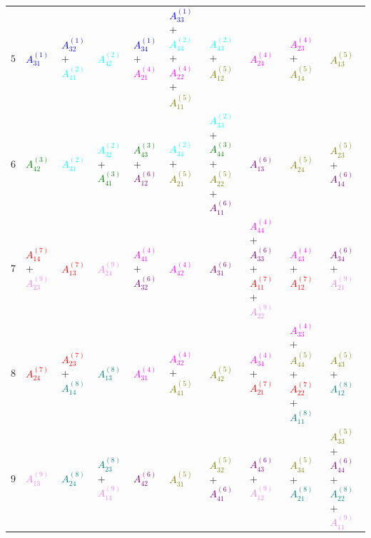 \documentclass[times,namecite]{goose-article}
\begin{document}
\begin{landscape}
{\begin{tabular}{|c|C{31mm}C{31mm}C{31mm}C{31mm}C{31mm}C{31mm}C{31mm}C{31mm}C{31mm}|}
$5 $& \textcolor{blue}{$A_{31}^{(1)}$} & \textcolor{blue}{$A_{32}^{(1)}$}+\textcolor{cyan}{$A_{41}^{(2)}$} & \textcolor{cyan}{$A_{42}^{(2)}$} & \textcolor{blue}{$A_{34}^{(1)}$}+\textcolor{magenta}{$A_{21}^{(4)}$} & \textcolor{blue}{$A_{33}^{(1)}$}+\textcolor{cyan}{$A_{44}^{(2)}$}+\textcolor{magenta}{$A_{22}^{(4)}$}+\textcolor{olive}{$A_{11}^{(5)}$} & \textcolor{cyan}{$A_{43}^{(2)}$}+\textcolor{olive}{$A_{12}^{(5)}$} & \textcolor{magenta}{$A_{24}^{(4)}$} & \textcolor{magenta}{$A_{23}^{(4)}$}+\textcolor{olive}{$A_{14}^{(5)}$} & \textcolor{olive}{$A_{13}^{(5)}$} \\
$6 $& \textcolor{green}{$A_{42}^{(3)}$} & \textcolor{cyan}{$A_{31}^{(2)}$} & \textcolor{cyan}{$A_{32}^{(2)}$}+\textcolor{green}{$A_{41}^{(3)}$} & \textcolor{green}{$A_{43}^{(3)}$}+\textcolor{purple}{$A_{12}^{(6)}$} & \textcolor{cyan}{$A_{34}^{(2)}$}+\textcolor{olive}{$A_{21}^{(5)}$} & \textcolor{cyan}{$A_{33}^{(2)}$}+\textcolor{green}{$A_{44}^{(3)}$}+\textcolor{olive}{$A_{22}^{(5)}$}+\textcolor{purple}{$A_{11}^{(6)}$} & \textcolor{purple}{$A_{13}^{(6)}$} & \textcolor{olive}{$A_{24}^{(5)}$} & \textcolor{olive}{$A_{23}^{(5)}$}+\textcolor{purple}{$A_{14}^{(6)}$} \\
$7 $& \textcolor{red}{$A_{14}^{(7)}$}+\textcolor{violet}{$A_{23}^{(9)}$} & \textcolor{red}{$A_{13}^{(7)}$} & \textcolor{violet}{$A_{24}^{(9)}$} & \textcolor{magenta}{$A_{41}^{(4)}$}+\textcolor{purple}{$A_{32}^{(6)}$} & \textcolor{magenta}{$A_{42}^{(4)}$} & \textcolor{purple}{$A_{31}^{(6)}$} & \textcolor{magenta}{$A_{44}^{(4)}$}+\textcolor{purple}{$A_{33}^{(6)}$}+\textcolor{red}{$A_{11}^{(7)}$}+\textcolor{violet}{$A_{22}^{(9)}$} & \textcolor{magenta}{$A_{43}^{(4)}$}+\textcolor{red}{$A_{12}^{(7)}$} & \textcolor{purple}{$A_{34}^{(6)}$}+\textcolor{violet}{$A_{21}^{(9)}$} \\
$8 $& \textcolor{red}{$A_{24}^{(7)}$} & \textcolor{red}{$A_{23}^{(7)}$}+\textcolor{teal}{$A_{14}^{(8)}$} & \textcolor{teal}{$A_{13}^{(8)}$} & \textcolor{magenta}{$A_{31}^{(4)}$} & \textcolor{magenta}{$A_{32}^{(4)}$}+\textcolor{olive}{$A_{41}^{(5)}$} & \textcolor{olive}{$A_{42}^{(5)}$} & \textcolor{magenta}{$A_{34}^{(4)}$}+\textcolor{red}{$A_{21}^{(7)}$} & \textcolor{magenta}{$A_{33}^{(4)}$}+\textcolor{olive}{$A_{44}^{(5)}$}+\textcolor{red}{$A_{22}^{(7)}$}+\textcolor{teal}{$A_{11}^{(8)}$} & \textcolor{olive}{$A_{43}^{(5)}$}+\textcolor{teal}{$A_{12}^{(8)}$} \\
$9 $& \textcolor{violet}{$A_{13}^{(9)}$} & \textcolor{teal}{$A_{24}^{(8)}$} & \textcolor{teal}{$A_{23}^{(8)}$}+\textcolor{violet}{$A_{14}^{(9)}$} & \textcolor{purple}{$A_{42}^{(6)}$} & \textcolor{olive}{$A_{31}^{(5)}$} & \textcolor{olive}{$A_{32}^{(5)}$}+\textcolor{purple}{$A_{41}^{(6)}$} & \textcolor{purple}{$A_{43}^{(6)}$}+\textcolor{violet}{$A_{12}^{(9)}$} & \textcolor{olive}{$A_{34}^{(5)}$}+\textcolor{teal}{$A_{21}^{(8)}$} & \textcolor{olive}{$A_{33}^{(5)}$}+\textcolor{purple}{$A_{44}^{(6)}$}+\textcolor{teal}{$A_{22}^{(8)}$}+\textcolor{violet}{$A_{11}^{(9)}$} \\ \hline
\end{tabular}
}


\end{landscape}
\end{document}

